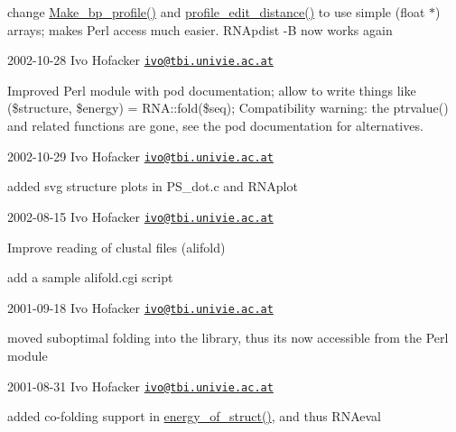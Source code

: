 \begin{DoxyItemize}
\item change \mbox{\hyperlink{profiledist_8h_a904c7eaf4a2413567c00ac4891749d18}{Make\+\_\+bp\+\_\+profile()}} and \mbox{\hyperlink{profiledist_8h_abe75e90e00a1e5dd8862944ed53dad5d}{profile\+\_\+edit\+\_\+distance()}} to use simple (float $\ast$) arrays; makes Perl access much easier. R\+N\+Apdist -\/B now works again
\end{DoxyItemize}

2002-\/10-\/28 Ivo Hofacker \href{mailto:ivo@tbi.univie.ac.at}{\tt ivo@tbi.\+univie.\+ac.\+at}


\begin{DoxyItemize}
\item Improved Perl module with pod documentation; allow to write things like (\$structure, \$energy) = R\+N\+A\+::fold(\$seq); Compatibility warning\+: the ptrvalue() and related functions are gone, see the pod documentation for alternatives.
\end{DoxyItemize}

2002-\/10-\/29 Ivo Hofacker \href{mailto:ivo@tbi.univie.ac.at}{\tt ivo@tbi.\+univie.\+ac.\+at}


\begin{DoxyItemize}
\item added svg structure plots in P\+S\+\_\+dot.\+c and R\+N\+Aplot
\end{DoxyItemize}

2002-\/08-\/15 Ivo Hofacker \href{mailto:ivo@tbi.univie.ac.at}{\tt ivo@tbi.\+univie.\+ac.\+at}


\begin{DoxyItemize}
\item Improve reading of clustal files (alifold)
\item add a sample alifold.\+cgi script
\end{DoxyItemize}

2001-\/09-\/18 Ivo Hofacker \href{mailto:ivo@tbi.univie.ac.at}{\tt ivo@tbi.\+univie.\+ac.\+at}


\begin{DoxyItemize}
\item moved suboptimal folding into the library, thus it\textquotesingle{}s now accessible from the Perl module
\end{DoxyItemize}

2001-\/08-\/31 Ivo Hofacker \href{mailto:ivo@tbi.univie.ac.at}{\tt ivo@tbi.\+univie.\+ac.\+at}


\begin{DoxyItemize}
\item added co-\/folding support in \mbox{\hyperlink{group__eval_gac2b37fea2145c94d925a3f33378ef87b}{energy\+\_\+of\+\_\+struct()}}, and thus R\+N\+Aeval
\end{DoxyItemize}

